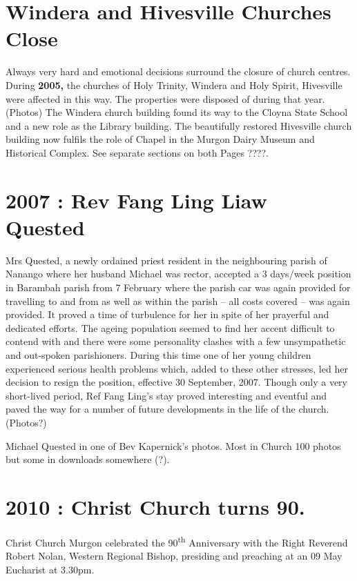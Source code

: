 \section{Windera and Hivesville Churches
Close}

Always very hard and emotional decisions surround the closure of church
centres. During \textbf{2005,} the churches of Holy Trinity, Windera and
Holy Spirit, Hivesville were affected in this way. The properties were
disposed of during that year. (Photos) The Windera church building found
its way to the Cloyna State School and a new role as the Library
building. The beautifully restored Hivesville church building now
fulfils the role of Chapel in the Murgon Dairy Museum and Historical
Complex. See separate sections on both Pages ????.

\section{2007 : Rev Fang Ling Liaw
Quested}

Mrs Quested, a newly ordained priest resident in the neighbouring parish
of Nanango where her husband Michael was rector, accepted a 3 days/week
position in Barambah parish from 7 February where the parish car was
again provided for travelling to and from as well as within the parish
-- all costs covered -- was again provided. It proved a time of
turbulence for her in spite of her prayerful and dedicated efforts. The
ageing population seemed to find her accent difficult to contend with
and there were some personality clashes with a few unsympathetic and
out-spoken parishioners. During this time one of her young children
experienced serious health problems which, added to these other
stresses, led her decision to resign the position, effective 30
September, 2007. Though only a very short-lived period, Ref Fang Ling's
stay proved interesting and eventful and paved the way for a number of
future developments in the life of the church. (Photos?)

Michael Quested in one of Bev Kapernick's photos. Most in Church 100
photos but some in downloads somewhere (?).

\section{2010 : Christ Church turns 90.}

Christ Church Murgon celebrated the 90\textsuperscript{th} Anniversary
with the Right Reverend Robert Nolan, Western Regional Bishop, presiding
and preaching at an 09 May Eucharist at 3.30pm.

